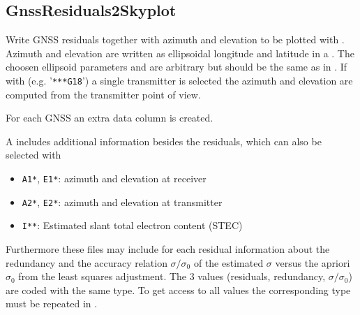 \clearpage
\subsection{GnssResiduals2Skyplot}\label{GnssResiduals2Skyplot}
Write GNSS residuals together with azimuth and elevation to be plotted with .
Azimuth and elevation are written as ellipsoidal longitude and latitude in a .
The choosen ellipsoid parameters  and  are arbitrary but should be the same
as in . If with  (e.g. '\verb|***G18|')
a single transmitter is selected the azimuth and elevation are computed from the transmitter point of view.

For each GNSS  an extra data column is created.

A  includes additional information
besides the residuals, which can also be selected with 
\begin{itemize}
\item \verb|A1*|, \verb|E1*|: azimuth and elevation at receiver
\item \verb|A2*|, \verb|E2*|: azimuth and elevation at transmitter
\item \verb|I**|: Estimated slant total electron content (STEC)
\end{itemize}

Furthermore these files may include for each residual 
information about the redundancy and the accuracy relation $\sigma/\sigma_0$
of the estimated $\sigma$ versus the apriori $\sigma_0$ from the least squares adjustment.
The 3 values (residuals, redundancy, $\sigma/\sigma_0$) are coded with the same type.
To get access to all values the corresponding type must be repeated in .




